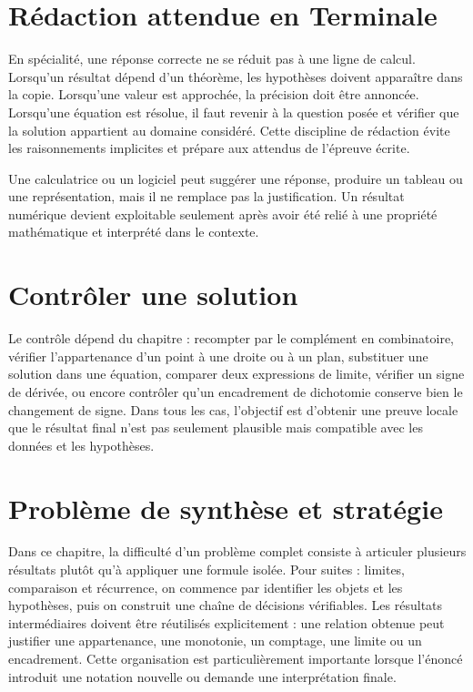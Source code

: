 \section{Rédaction attendue en Terminale}
En spécialité, une réponse correcte ne se réduit pas à une ligne de calcul. Lorsqu'un résultat dépend d'un théorème, les hypothèses doivent apparaître dans la copie. Lorsqu'une valeur est approchée, la précision doit être annoncée. Lorsqu'une équation est résolue, il faut revenir à la question posée et vérifier que la solution appartient au domaine considéré. Cette discipline de rédaction évite les raisonnements implicites et prépare aux attendus de l'épreuve écrite.

\begin{attention}
Une calculatrice ou un logiciel peut suggérer une réponse, produire un tableau ou une représentation, mais il ne remplace pas la justification. Un résultat numérique devient exploitable seulement après avoir été relié à une propriété mathématique et interprété dans le contexte.
\end{attention}

\section{Contrôler une solution}
Le contrôle dépend du chapitre : recompter par le complément en combinatoire, vérifier l'appartenance d'un point à une droite ou à un plan, substituer une solution dans une équation, comparer deux expressions de limite, vérifier un signe de dérivée, ou encore contrôler qu'un encadrement de dichotomie conserve bien le changement de signe. Dans tous les cas, l'objectif est d'obtenir une preuve locale que le résultat final n'est pas seulement plausible mais compatible avec les données et les hypothèses.

\section{Problème de synthèse et stratégie}

Dans ce chapitre, la difficulté d'un problème complet consiste à articuler plusieurs résultats plutôt qu'à appliquer une formule isolée. Pour suites : limites, comparaison et récurrence, on commence par identifier les objets et les hypothèses, puis on construit une chaîne de décisions vérifiables. Les résultats intermédiaires doivent être réutilisés explicitement : une relation obtenue peut justifier une appartenance, une monotonie, un comptage, une limite ou un encadrement. Cette organisation est particulièrement importante lorsque l'énoncé introduit une notation nouvelle ou demande une interprétation finale.


